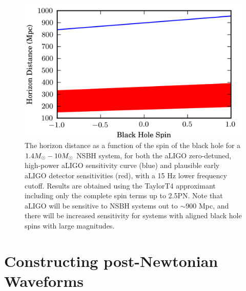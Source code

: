 \begin{figure}
\includegraphics{papers/nsbh_faithfulness/figure1.png}
\caption{\label{fig:t4horizon} 
The horizon distance as a function of the spin of the black hole 
for a $1.4M_\odot-10M_\odot$ \ac{NSBH} system, for both the \ac{aLIGO} zero-detuned,
high-power aLIGO sensitivity curve (blue) and plausible early \ac{aLIGO}
detector sensitivities (red), with a 15 Hz lower frequency cutoff. 
Results are obtained using the TaylorT4 approximant including only the 
complete spin terms up to 2.5\ac{PN}. Note that \ac{aLIGO} will be sensitive to
\ac{NSBH} systems out to $\sim 900$ Mpc, and there will be increased sensitivity
for systems with aligned black hole spins with large magnitudes. 
}
\end{figure}

\section{Constructing post-Newtonian Waveforms}
\label{sec:waveforms}


